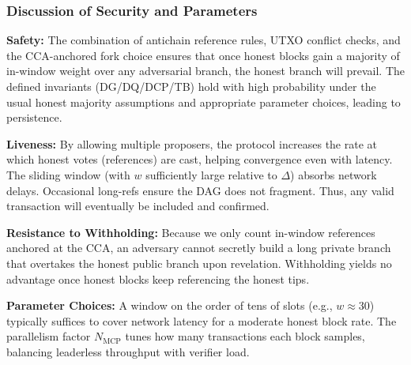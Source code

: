 \documentclass[11pt]{article}
\newcommand{\MCP}{\ensuremath{\mathrm{MCP}}\xspace}
\begin{document}
\subsubsection{Discussion of Security and Parameters}
\noindent
\textbf{Safety:} The combination of antichain reference rules, UTXO conflict checks, and the CCA-anchored fork choice ensures that once honest blocks gain a majority of in-window weight over any adversarial branch, the honest branch will prevail. The defined invariants (DG/DQ/DCP/TB) hold with high probability under the usual honest majority assumptions and appropriate parameter choices, leading to persistence.

\smallskip

\noindent
\textbf{Liveness:} By allowing multiple proposers, the protocol increases the rate at which honest votes (references) are cast, helping convergence even with latency. The sliding window (with $w$ sufficiently large relative to $\Delta$) absorbs network delays. Occasional long-refs ensure the DAG does not fragment. Thus, any valid transaction will eventually be included and confirmed.

\smallskip

\noindent
\textbf{Resistance to Withholding:} Because we only count in-window references anchored at the CCA, an adversary cannot secretly build a long private branch that overtakes the honest public branch upon revelation. Withholding yields no advantage once honest blocks keep referencing the honest tips.

\smallskip

\noindent
\textbf{Parameter Choices:} A window on the order of tens of slots (e.g., $w\approx 30$) typically suffices to cover network latency for a moderate honest block rate. The parallelism factor $N_{\MCP}$ tunes how many transactions each block samples, balancing leaderless throughput with verifier load.
\end{document}
